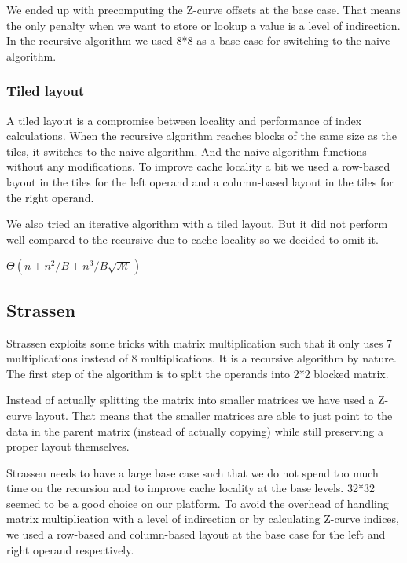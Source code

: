 We ended up with precomputing the Z-curve offsets at the base case. That means the only penalty when we want to store or lookup a value is a level of indirection. In the recursive algorithm we used 8*8 as a base case for switching to the naive algorithm.

\subsubsection{Tiled layout}

A tiled layout is a compromise between locality and performance of index calculations. When the recursive algorithm reaches blocks of the same size as the tiles, it switches to the naive algorithm. And the naive algorithm functions without any modifications. To improve cache locality a bit we used a row-based layout in the tiles for the left operand and a column-based layout in the tiles for the right operand.

We also tried an iterative algorithm with a tiled layout. But it did not perform well compared to the recursive due to cache locality so we decided to omit it.

$\Theta(n+n^2/B + n^3/B\sqrt{\mathcal{M}})$

\subsection{Strassen}

Strassen exploits some tricks with matrix multiplication such that it only uses 7 multiplications instead of 8 multiplications. It is a recursive algorithm by nature. The first step of the algorithm is to split the operands into 2*2 blocked matrix.

Instead of actually splitting the matrix into smaller matrices we have used a Z-curve layout. That means that the smaller matrices are able to just point to the data in the parent matrix (instead of actually copying) while still preserving a proper layout themselves.

Strassen needs to have a large base case such that we do not spend too much time on the recursion and to improve cache locality at the base levels. 32*32 seemed to be a good choice on our platform. To avoid the overhead of handling matrix multiplication with a level of indirection or by calculating Z-curve indices, we used a row-based and column-based layout at the base case for the left and right operand respectively.

